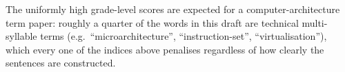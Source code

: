 \documentclass[12pt,a4paper]{article}
\begin{document}
The uniformly high grade-level scores are expected for a
computer-architecture term paper: roughly a quarter of the words in
this draft are technical multi-syllable terms (e.g.\ ``microarchitecture'',
``instruction-set'', ``virtualisation''), which every one of the
indices above penalises regardless of how clearly the sentences are
constructed.

\clearpage



\clearpage
\printnoidxglossaries

\clearpage
\printindex
\end{document}
